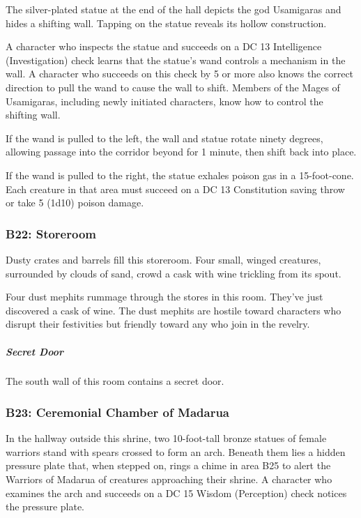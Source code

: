 \documentclass[10pt,a4paper,twoside,bg=print,twocolumn,openany,nodeprecatedcode]{dndbook}
\begin{document}
The silver-plated statue at the end of the hall depicts the god Usamigaras and hides a shifting wall. Tapping on the statue reveals its hollow construction.

A character who inspects the statue and succeeds on a DC 13 Intelligence (Investigation) check learns that the statue's wand controls a mechanism in the wall. A character who succeeds on this check by 5 or more also knows the correct direction to pull the wand to cause the wall to shift. Members of the Mages of Usamigaras, including newly initiated characters, know how to control the shifting wall.

If the wand is pulled to the left, the wall and statue rotate ninety degrees, allowing passage into the corridor beyond for 1 minute, then shift back into place.

If the wand is pulled to the right, the statue exhales poison gas in a 15-foot-cone. Each creature in that area must succeed on a DC 13 Constitution saving throw or take 5 (1d10) poison damage.

\subsubsection{B22: Storeroom}
\begin{DndReadAloud}{}
Dusty crates and barrels fill this storeroom. Four small, winged creatures, surrounded by clouds of sand, crowd a cask with wine trickling from its spout.

\end{DndReadAloud}

Four dust mephits rummage through the stores in this room. They've just discovered a cask of wine. The dust mephits are hostile toward characters who disrupt their festivities but friendly toward any who join in the revelry.

\subparagraph{Secret Door}
The south wall of this room contains a secret door.

\subsubsection{B23: Ceremonial Chamber of Madarua}
In the hallway outside this shrine, two 10-foot-tall bronze statues of female warriors stand with spears crossed to form an arch. Beneath them lies a hidden pressure plate that, when stepped on, rings a chime in area B25 to alert the Warriors of Madarua of creatures approaching their shrine. A character who examines the arch and succeeds on a DC 15 Wisdom (Perception) check notices the pressure plate.
\end{document}

